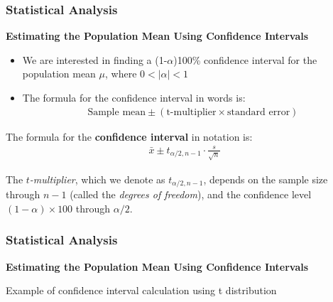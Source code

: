 \documentclass{beamer}
\begin{document}
\begin{frame}
\frametitle{Statistical Analysis}
\textbf{Estimating the Population Mean Using Confidence Intervals}\\
\vspace{0.2cm}
\begin{itemize}
\item We are interested in finding a (1-$\alpha$)100\% confidence interval for the population mean $\mu$, where $0< |\alpha| < 1$
\vspace{0.2cm}
\item The formula for the confidence interval in words is:
\vspace{-0.3cm}
\begin{align*}
\textrm{Sample mean} \pm (\textrm{t-multiplier} \times \textrm{standard error})
\end{align*}
\end{itemize}
\vspace{-0.3cm}
\begin{tcolorbox}
The formula for the \textbf{confidence interval} in notation is:
\begin{align*}
\bar{x} \pm t_{\alpha/2,n-1} \cdot \frac{s}{\sqrt{n}}
\end{align*}
\end{tcolorbox}
\vspace{0.1cm}
The \textit{$t$-multiplier}, which we denote as $t_{\alpha/2,n-1}$, depends on the sample size through $n-1$ (called the \textit{degrees of freedom}), and the confidence level $(1-\alpha) \times 100$ through $\alpha/2$.
\end{frame}


\begin{frame}
\frametitle{Statistical Analysis}
\textbf{Estimating the Population Mean Using Confidence Intervals}\\
\vspace{0.2cm}
\begin{example}
Example of confidence interval calculation using t distribution
\end{example}
\end{frame}

\end{document}

